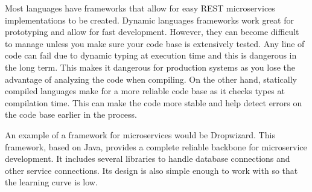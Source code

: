 Most languages have frameworks that allow for easy REST microservices implementations to be created. Dynamic languages frameworks work great for prototyping and allow for fast development. However, they can become difficult to manage unless you make sure your code base is extensively tested. Any line of code can fail due to dynamic typing at execution time and this is dangerous in the long term. This makes it dangerous for production systems as you lose the advantage of analyzing the code when compiling. On the other hand, statically compiled languages make for a more reliable code base as it checks types at compilation time. This can make the code more stable and help detect errors on the code base earlier in the process. 

An example of a framework for microservices would be Dropwizard. This framework, based on Java, provides a complete reliable backbone for microservice development. It includes several libraries to handle database connections and other service connections. Its design is also simple enough to work with so that the learning curve is low. 


